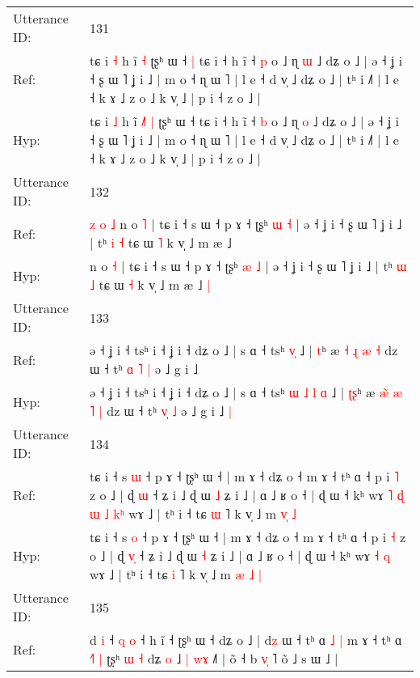 \documentclass[10pt]{article}
\DeclareRobustCommand{\hl}[1]{{\textcolor{red}{#1}}}
\begin{document}
\begin{longtable}{ll}
 \\
\midrule
Utterance ID: & 131 \\
Ref: & tɕ i \hl{˧} h ĩ\hl{}\hl{}\hl{} \hl{˧} ʈʂʰ ɯ ˧\hl{ }\hl{|} tɕ i ˧ h ĩ ˧ \hl{p} o ˩ ɳ \hl{ɯ} ˩ dʑ o ˩ | ə ˧ ʝ i ˧ ʂ ɯ ˥ ʝ i ˩ | m o ˧ ɳ ɯ ˥ | l e ˧ d v̩ ˩ dʑ o ˩ | tʰ i ˩˥ | l e ˧ k ɤ ˩ z o ˩ k v̩ ˩ | p i ˧ z o ˩ |
 \\
Hyp: & tɕ i \hl{˩} h ĩ\hl{ }\hl{˩}\hl{˥} \hl{|} ʈʂʰ ɯ ˧\hl{}\hl{} tɕ i ˧ h ĩ ˧ \hl{b} o ˩ ɳ \hl{o} ˩ dʑ o ˩ | ə ˧ ʝ i ˧ ʂ ɯ ˥ ʝ i ˩ | m o ˧ ɳ ɯ ˥ | l e ˧ d v̩ ˩ dʑ o ˩ | tʰ i ˩˥ | l e ˧ k ɤ ˩ z o ˩ k v̩ ˩ | p i ˧ z o ˩ |
 \\
\midrule
Utterance ID: & 132 \\
Ref: & \hl{z}\hl{ }\hl{o}\hl{ }\hl{˩}\hl{ }n o \hl{˥} | tɕ i ˧ s ɯ ˧ p ɤ ˧ ʈʂʰ \hl{ɯ} \hl{˧} | ə ˧ ʝ i ˧ ʂ ɯ ˥ ʝ i ˩ | tʰ \hl{i} \hl{˧} tɕ ɯ \hl{˥} k v̩ ˩ m æ ˩\hl{}\hl{}
 \\
Hyp: & \hl{}\hl{}\hl{}\hl{}\hl{}\hl{}n o \hl{˧} | tɕ i ˧ s ɯ ˧ p ɤ ˧ ʈʂʰ \hl{æ} \hl{˩} | ə ˧ ʝ i ˧ ʂ ɯ ˥ ʝ i ˩ | tʰ \hl{ɯ} \hl{˩} tɕ ɯ \hl{˧} k v̩ ˩ m æ ˩\hl{ }\hl{|}
 \\
\midrule
Utterance ID: & 133 \\
Ref: & ə ˧ ʝ i ˧ tsʰ i ˧ ʝ i ˧ dʑ o ˩ | s ɑ ˧ tsʰ\hl{}\hl{}\hl{}\hl{} \hl{}\hl{v}\hl{̩} ˩ | \hl{}\hl{t}ʰ æ \hl{}\hl{˧} \hl{ɻ} \hl{æ} \hl{˧} dz ɯ ˧ tʰ \hl{ɑ}\hl{ }\hl{˥} \hl{|} ə ˩ g i ˩\hl{}\hl{}
 \\
Hyp: & ə ˧ ʝ i ˧ tsʰ i ˧ ʝ i ˧ dʑ o ˩ | s ɑ ˧ tsʰ\hl{ }\hl{ɯ}\hl{ }\hl{˩} \hl{l}\hl{ }\hl{ɑ} ˩ | \hl{ʈ}\hl{ʂ}ʰ æ \hl{æ}\hl{̃} \hl{æ} \hl{˥} \hl{|} dz ɯ ˧ tʰ \hl{}\hl{v}\hl{̩} \hl{˩} ə ˩ g i ˩\hl{ }\hl{|}
 \\
\midrule
Utterance ID: & 134 \\
Ref: & tɕ i ˧ s \hl{ɯ} ˧ p ɤ ˧ ʈʂʰ ɯ ˧ | m ɤ ˧ dʑ o ˧ m ɤ ˧ tʰ ɑ ˧ p i \hl{˥} z o ˩ | ɖ \hl{}\hl{ɯ} ˧ ʑ i ˩ ɖ ɯ \hl{˩} ʑ i ˩ | ɑ ˩ ʁ o ˧ | ɖ ɯ ˧ kʰ wɤ\hl{ }\hl{˥}\hl{ }\hl{ɖ}\hl{ }\hl{ɯ} \hl{˩} \hl{k}\hl{ʰ} wɤ ˩ | tʰ i ˧ tɕ \hl{ɯ} ˥ k v̩ ˩ m \hl{}\hl{v}\hl{̩} \hl{˩}
 \\
Hyp: & tɕ i ˧ s \hl{o} ˧ p ɤ ˧ ʈʂʰ ɯ ˧ | m ɤ ˧ dʑ o ˧ m ɤ ˧ tʰ ɑ ˧ p i \hl{˧} z o ˩ | ɖ \hl{v}\hl{̩} ˧ ʑ i ˩ ɖ ɯ \hl{˧} ʑ i ˩ | ɑ ˩ ʁ o ˧ | ɖ ɯ ˧ kʰ wɤ\hl{}\hl{}\hl{}\hl{}\hl{}\hl{} \hl{˧} \hl{}\hl{q} wɤ ˩ | tʰ i ˧ tɕ \hl{i} ˥ k v̩ ˩ m \hl{æ}\hl{ }\hl{˩} \hl{|}
 \\
\midrule
Utterance ID: & 135 \\
Ref: & d\hl{} \hl{i} ˧ \hl{q} \hl{}\hl{o} ˧ h ĩ ˧ ʈʂʰ ɯ ˧ dʑ o ˩ | d\hl{z} ɯ ˧ tʰ ɑ\hl{ }\hl{˩} \hl{|} m ɤ ˧ tʰ ɑ\hl{}\hl{} \hl{˧}\hl{˥} \hl{|} ʈʂʰ \hl{ɯ} \hl{˧} dʑ \hl{o} ˩\hl{ }\hl{|} \hl{w}\hl{ɤ} ˩˥ | õ ˧ b \hl{v}\hl{̩} ˥ õ ˩ s ɯ ˩ |

\end{longtable}
\end{document}
